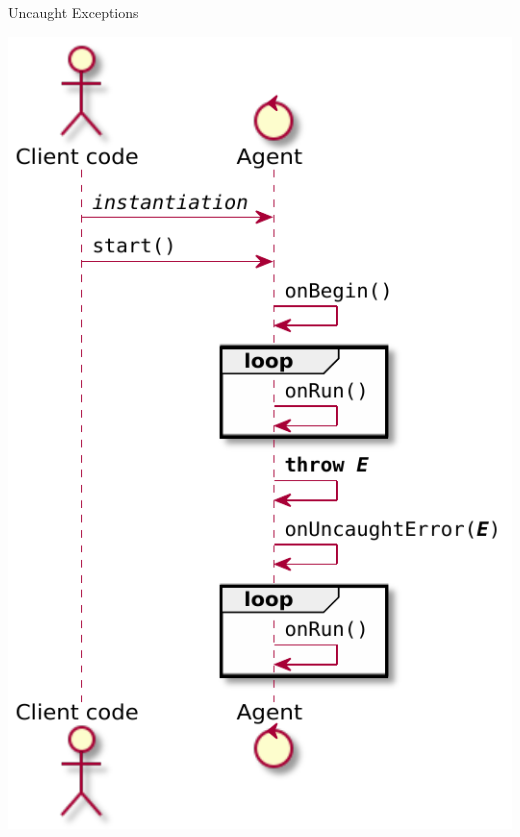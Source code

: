 \documentclass[presentation]{beamer}\mode<presentation>{\usetheme{AMSCesenaPurpleAndGold}}
\begin{document}
\begin{frame}[allowframebreaks]{Uncaught Exceptions}
    \begin{center}
    	\includegraphics[height=.8\textheight]{img/exceptional-flow-1.pdf}
    \end{center}


\end{frame}
\end{document}

